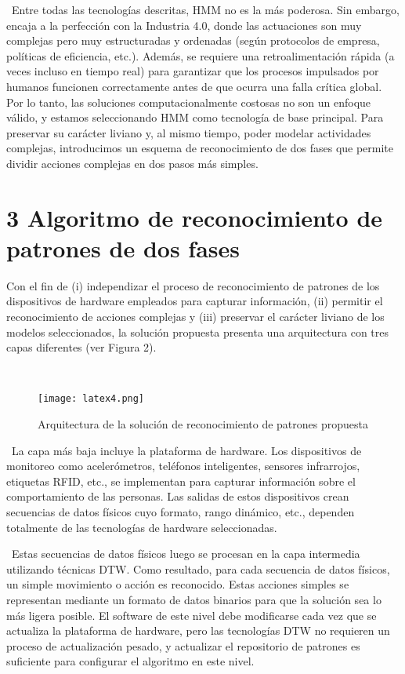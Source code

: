 \documentclass{paper}
\begin{document}
\ Entre todas las tecnologías descritas, HMM no es la más poderosa. Sin embargo, encaja a la perfección con la Industria 4.0, donde las actuaciones son muy complejas pero muy estructuradas y ordenadas (según protocolos de empresa, políticas de eficiencia, etc.). Además, se requiere una retroalimentación rápida (a veces incluso en tiempo real) para garantizar que los procesos impulsados por humanos funcionen correctamente antes de que ocurra una falla crítica global. Por lo tanto, las soluciones computacionalmente costosas no son un enfoque válido, y estamos seleccionando HMM como tecnología de base principal. Para preservar su carácter liviano y, al mismo tiempo, poder modelar actividades complejas, introducimos un esquema de reconocimiento de dos fases que permite dividir acciones complejas en dos pasos más simples.


\section*{3  Algoritmo de reconocimiento de patrones de dos fases}

Con el fin de (i) independizar el proceso de reconocimiento de patrones de los dispositivos de hardware empleados para capturar información, (ii) permitir el reconocimiento de acciones complejas y (iii) preservar el carácter liviano de los modelos seleccionados, la solución propuesta presenta una arquitectura con tres capas diferentes (ver Figura 2).


\ \begin{figure}[H]
    \centering
    \texttt{[image: latex4.png]}
    \caption{Arquitectura de la solución de reconocimiento de patrones propuesta}
    \label{fig:my_label}
\end{figure}


\ La capa más baja incluye la plataforma de hardware. Los dispositivos de monitoreo como acelerómetros, teléfonos inteligentes, sensores infrarrojos, etiquetas RFID, etc., se implementan para capturar información sobre el comportamiento de las personas. Las salidas de estos dispositivos crean
secuencias de datos físicos cuyo formato, rango dinámico, etc., dependen totalmente de las tecnologías de hardware seleccionadas.


\ Estas secuencias de datos físicos luego se procesan en la capa intermedia utilizando técnicas DTW. Como resultado, para cada secuencia de datos físicos, un simple movimiento o acción es reconocido. Estas acciones simples se representan mediante un formato de datos binarios para que la solución sea lo más ligera posible. El software de este nivel debe modificarse cada
vez que se actualiza la plataforma de hardware, pero las tecnologías DTW no requieren un proceso de actualización pesado, y actualizar el repositorio de patrones es suficiente para configurar el algoritmo en este nivel.
\end{document}
